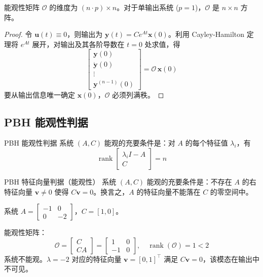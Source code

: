 能观性矩阵 $\mathcal{O}$ 的维度为 $(n \cdot p) \times n$。对于单输出系统 ($p=1$)，$\mathcal{O}$ 是 $n \times n$ 方阵。

\begin{proof}
令 $\mathbf{u}(t) \equiv 0$，则输出为 $\mathbf{y}(t) = C e^{At}\mathbf{x}(0)$。利用 Cayley-Hamilton 定理将 $e^{At}$ 展开，对输出及其各阶导数在 $t=0$ 处求值，得
\[
\begin{bmatrix}
\mathbf{y}(0) \\ \dot{\mathbf{y}}(0) \\ \vdots \\ \mathbf{y}^{(n-1)}(0)
\end{bmatrix} = \mathcal{O}\,\mathbf{x}(0)
\]
要从输出信息唯一确定 $\mathbf{x}(0)$，$\mathcal{O}$ 必须列满秩。
\end{proof}

\subsection{PBH 能观性判据}

\begin{myTheorem}{PBH 能观性判据}
系统 $(A, C)$ 能观的充要条件是：对 $A$ 的每个特征值 $\lambda_i$，有
\[
\operatorname{rank}\!\begin{bmatrix} \lambda_i I - A \\ C \end{bmatrix} = n
\]
\end{myTheorem}

\begin{myTheorem}{PBH 特征向量判据（能观性）}
系统 $(A, C)$ 能观的充要条件是：不存在 $A$ 的右特征向量 $\mathbf{v} \neq 0$ 使得 $C\mathbf{v} = 0$。换言之，$A$ 的特征向量不能落在 $C$ 的零空间中。
\end{myTheorem}

\begin{example}
系统 $A = \begin{bmatrix} -1 & 0 \\ 0 & -2 \end{bmatrix}$，$C = [1, 0]$。

能观性矩阵：
\[
\mathcal{O} = \begin{bmatrix} C \\ CA \end{bmatrix} = \begin{bmatrix} 1 & 0 \\ -1 & 0 \end{bmatrix},\quad
\operatorname{rank}(\mathcal{O}) = 1 < 2
\]
系统不能观。$\lambda=-2$ 对应的特征向量 $\mathbf{v} = [0, 1]^{\top}$ 满足 $C\mathbf{v} = 0$，该模态在输出中不可见。
\end{example}

